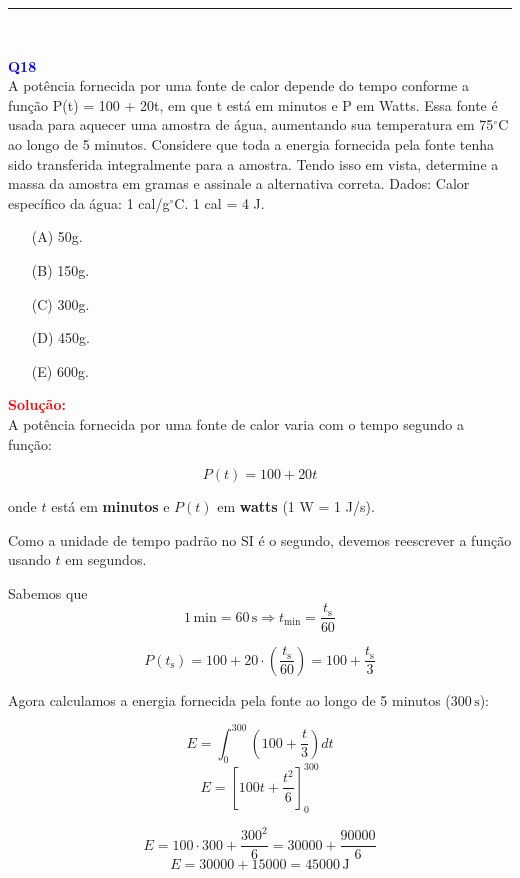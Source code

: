 \documentclass[a4paper,12pt]{article}
\begin{document}
\noindent\rule{\linewidth}{0.6pt}\\

\begin{flushleft}
\textbf{\textcolor{blue}{\Large Q18}}\\
A potência fornecida por uma fonte de calor depende do tempo conforme a função
P(t) = 100 + 20t, em que t está em minutos e P em Watts. Essa fonte é usada para aquecer uma
amostra de água, aumentando sua temperatura em 75$^{\circ}$C ao longo de 5 minutos. Considere que
toda a energia fornecida pela fonte tenha sido transferida integralmente para a amostra. Tendo
isso em vista, determine a massa da amostra em gramas e assinale a alternativa correta.
Dados:
Calor específico da água: 1 cal/g$^{\circ}$C.
1 cal = 4 J.

\begin{itemize}
\item[(A)] 50g.
\item[(B)] 150g.
\item[(C)] 300g.
\item[(D)] 450g.
\item[(E)] 600g.
\end{itemize}

\vspace{0.5cm}

\textcolor{red}{\textbf{Solução:}}\\

A potência fornecida por uma fonte de calor varia com o tempo segundo a função:

\[
P(t) = 100 + 20t
\]

onde $t$ está em \textbf{minutos} e $P(t)$ em \textbf{watts} (1 W = 1 J/s).

Como a unidade de tempo padrão no SI é o segundo, devemos reescrever a função usando $t$ em segundos.

Sabemos que $$1\,\text{min} = 60\,\text{s} \Rightarrow t_{\text{min}} = \frac{t_{\text{s}}}{60}$$

\[
P(t_{\text{s}}) = 100 + 20 \cdot \left(\frac{t_{\text{s}}}{60}\right)
= 100 + \frac{t_{\text{s}}}{3}
\]

Agora calculamos a energia fornecida pela fonte ao longo de 5 minutos ($300\,\text{s}$):

\[
E = \int_0^{300} \left(100 + \frac{t}{3} \right) dt 
\]
\[
E = \left[100t + \frac{t^2}{6} \right]_0^{300}
\]

\[
E = 100 \cdot 300 + \frac{300^2}{6} = 30000 + \frac{90000}{6}
\]
\[
E = 30000 + 15000 = 45000\,\text{J}
\]


\end{flushleft}
\end{document}
